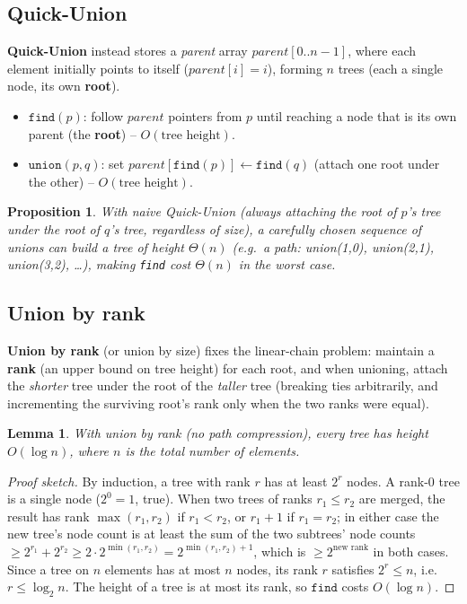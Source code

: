 \documentclass[11pt]{article}
\newtheorem{lemma}[theorem]{Lemma}
\newtheorem{proposition}[theorem]{Proposition}
\begin{document}
\subsection{Quick-Union}

\textbf{Quick-Union} instead stores a \emph{parent} array $parent[0..n-1]$, where each
element initially points to itself ($parent[i] = i$), forming $n$ trees (each a single
node, its own \textbf{root}).

\begin{itemize}
    \item $\texttt{find}(p)$: follow $parent$ pointers from $p$ until reaching a node that
    is its own parent (the \textbf{root}) -- $O(\text{tree height})$.
    \item $\texttt{union}(p,q)$: set $parent[\texttt{find}(p)] \gets \texttt{find}(q)$
    (attach one root under the other) -- $O(\text{tree height})$.
\end{itemize}

\begin{proposition}
With naive Quick-Union (always attaching the root of $p$'s tree under the root of $q$'s
tree, regardless of size), a carefully chosen sequence of unions can build a tree of
height $\Theta(n)$ (e.g.\ a path: union(1,0), union(2,1), union(3,2), \dots), making
\texttt{find} cost $\Theta(n)$ in the worst case.
\end{proposition}

\subsection{Union by rank}

\textbf{Union by rank} (or union by size) fixes the linear-chain problem: maintain a
\textbf{rank} (an upper bound on tree height) for each root, and when unioning, attach the
\emph{shorter} tree under the root of the \emph{taller} tree (breaking ties arbitrarily,
and incrementing the surviving root's rank only when the two ranks were equal).

\begin{lemma}
\label{lem:rank-bound}
With union by rank (no path compression), every tree has height $O(\log n)$, where $n$ is
the total number of elements.
\end{lemma}
\begin{proof}[Proof sketch]
By induction, a tree with rank $r$ has at least $2^r$ nodes. A rank-0 tree is a single
node ($2^0 = 1$, true). When two trees of ranks $r_1 \le r_2$ are merged, the result has
rank $\max(r_1, r_2)$ if $r_1 < r_2$, or $r_1 + 1$ if $r_1 = r_2$; in either case the new
tree's node count is at least the sum of the two subtrees' node counts $\ge 2^{r_1} +
2^{r_2} \ge 2 \cdot 2^{\min(r_1,r_2)} = 2^{\min(r_1,r_2)+1}$, which is $\ge 2^{\text{new
rank}}$ in both cases. Since a tree on $n$ elements has at most $n$ nodes, its rank $r$
satisfies $2^r \le n$, i.e.\ $r \le \log_2 n$. The height of a tree is at most its rank, so
$\texttt{find}$ costs $O(\log n)$.
\end{proof}
\end{document}
